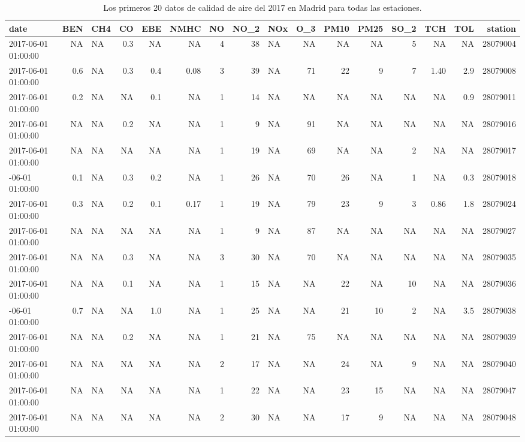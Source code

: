 \documentclass[]{book}
\begin{document}
\begin{table}

\caption{\label{tab:Madrid2017a}Los primeros 20 datos de calidad de aire del 2017 en Madrid para todas las estaciones.}
\centering
\begin{tabular}[t]{lrlrrrrrlrrrrrrr}
\toprule
date & BEN & CH4 & CO & EBE & NMHC & NO & NO\_2 & NOx & O\_3 & PM10 & PM25 & SO\_2 & TCH & TOL & station\\
\midrule
2017-06-01 01:00:00 & NA & NA & 0.3 & NA & NA & 4 & 38 & NA & NA & NA & NA & 5 & NA & NA & 28079004\\
2017-06-01 01:00:00 & 0.6 & NA & 0.3 & 0.4 & 0.08 & 3 & 39 & NA & 71 & 22 & 9 & 7 & 1.40 & 2.9 & 28079008\\
2017-06-01 01:00:00 & 0.2 & NA & NA & 0.1 & NA & 1 & 14 & NA & NA & NA & NA & NA & NA & 0.9 & 28079011\\
2017-06-01 01:00:00 & NA & NA & 0.2 & NA & NA & 1 & 9 & NA & 91 & NA & NA & NA & NA & NA & 28079016\\
2017-06-01 01:00:00 & NA & NA & NA & NA & NA & 1 & 19 & NA & 69 & NA & NA & 2 & NA & NA & 28079017\\
\addlinespace
2017-06-01 01:00:00 & 0.1 & NA & 0.3 & 0.2 & NA & 1 & 26 & NA & 70 & 26 & NA & 1 & NA & 0.3 & 28079018\\
2017-06-01 01:00:00 & 0.3 & NA & 0.2 & 0.1 & 0.17 & 1 & 19 & NA & 79 & 23 & 9 & 3 & 0.86 & 1.8 & 28079024\\
2017-06-01 01:00:00 & NA & NA & NA & NA & NA & 1 & 9 & NA & 87 & NA & NA & NA & NA & NA & 28079027\\
2017-06-01 01:00:00 & NA & NA & 0.3 & NA & NA & 3 & 30 & NA & 70 & NA & NA & NA & NA & NA & 28079035\\
2017-06-01 01:00:00 & NA & NA & 0.1 & NA & NA & 1 & 15 & NA & NA & 22 & NA & 10 & NA & NA & 28079036\\
\addlinespace
2017-06-01 01:00:00 & 0.7 & NA & NA & 1.0 & NA & 1 & 25 & NA & NA & 21 & 10 & 2 & NA & 3.5 & 28079038\\
2017-06-01 01:00:00 & NA & NA & 0.2 & NA & NA & 1 & 21 & NA & 75 & NA & NA & NA & NA & NA & 28079039\\
2017-06-01 01:00:00 & NA & NA & NA & NA & NA & 2 & 17 & NA & NA & 24 & NA & 9 & NA & NA & 28079040\\
2017-06-01 01:00:00 & NA & NA & NA & NA & NA & 1 & 22 & NA & NA & 23 & 15 & NA & NA & NA & 28079047\\
2017-06-01 01:00:00 & NA & NA & NA & NA & NA & 2 & 30 & NA & NA & 17 & 9 & NA & NA & NA & 28079048\\

\end{tabular}
\end{table}
\end{document}
